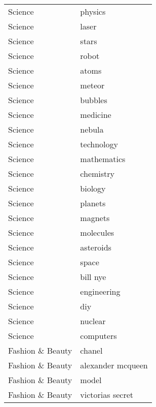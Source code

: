 \begin{supertabular}{l p{0.25\textwidth}}
          Science &                            physics \\
          Science &                              laser \\
          Science &                              stars \\
          Science &                              robot \\
          Science &                              atoms \\
          Science &                             meteor \\
          Science &                            bubbles \\
          Science &                           medicine \\
          Science &                             nebula \\
          Science &                         technology \\
          Science &                        mathematics \\
          Science &                          chemistry \\
          Science &                            biology \\
          Science &                            planets \\
          Science &                            magnets \\
          Science &                          molecules \\
          Science &                          asteroids \\
          Science &                              space \\
          Science &                           bill nye \\
          Science &                        engineering \\
          Science &                                diy \\
          Science &                            nuclear \\
          Science &                          computers \\
 Fashion \& Beauty &                             chanel \\
 Fashion \& Beauty &                  alexander mcqueen \\
 Fashion \& Beauty &                              model \\
 Fashion \& Beauty &                   victorias secret \\

\end{supertabular}
